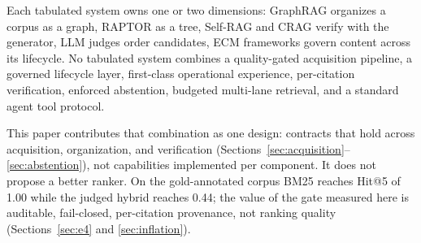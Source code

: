 Each tabulated system owns one or two dimensions: GraphRAG organizes a corpus as
a graph, RAPTOR as a tree, Self-RAG and CRAG verify with the generator, LLM
judges order candidates, ECM frameworks govern content across its lifecycle. No
tabulated system combines a quality-gated acquisition pipeline, a governed
lifecycle layer, first-class operational experience, per-citation verification,
enforced abstention, budgeted multi-lane retrieval, and a standard agent tool
protocol.

This paper contributes that combination as one design: contracts that hold
across acquisition, organization, and verification
(Sections~\ref{sec:acquisition}--\ref{sec:abstention}), not capabilities
implemented per component. It does not propose a better ranker. On the
gold-annotated corpus BM25 reaches Hit@5 of 1.00 while the judged hybrid reaches
0.44; the value of the gate measured here is auditable, fail-closed,
per-citation provenance, not ranking quality (Sections~\ref{sec:e4} and
\ref{sec:inflation}).

